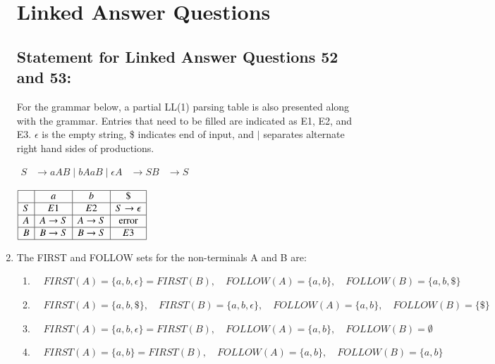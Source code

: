 \documentclass[journal]{IEEEtran}
\numberwithin{equation}{enumi}
\numberwithin{figure}{enumi}
\begin{document}
\begin{enumerate}
\begin{enumerate}
\end{enumerate}

\section*{Linked Answer Questions}

\subsection*{Statement for Linked Answer Questions 52 and 53:}

For the grammar below, a partial LL(1) parsing table is also presented along with the grammar. Entries that need to be filled are indicated as E1, E2, and E3. $\epsilon$ is the empty string, \$ indicates end of input, and $|$ separates alternate right hand sides of productions.

$
\begin{aligned}
S &\to aAB \;|\; bAaB \;|\; \epsilon 
A &\to S 
B &\to S
\end{aligned}
$

$
\begin{array}{|c|c|c|c|}
\hline
 & a & b & \$ \\
\hline
S & E1 & E2 & S \to \epsilon \\
\hline
A & A \to S & A \to S & \text{error} \\
\hline
B & B \to S & B \to S & E3 \\
\hline
\end{array}
$

\item The FIRST and FOLLOW sets for the non-terminals A and B are:
\begin{enumerate}
\item $\quad FIRST(A) = \{a,b,\epsilon\} = FIRST(B), \quad FOLLOW(A) = \{a,b\}, \quad FOLLOW(B) = \{a,b,\$\}$

\item $ \quad FIRST(A) = \{a,b,\$\}, \quad FIRST(B) = \{a,b,\epsilon\}, \quad FOLLOW(A) = \{a,b\}, \quad FOLLOW(B) = \{\$\} $

\item $ \quad FIRST(A) = \{a,b,\epsilon\} = FIRST(B), \quad FOLLOW(A) = \{a,b\}, \quad FOLLOW(B) = \emptyset
$
\item $ \quad FIRST(A) = \{a,b\} = FIRST(B), \quad FOLLOW(A) = \{a,b\}, \quad FOLLOW(B) = \{a,b\}$
\end{enumerate}


\end{enumerate}
\end{document}
